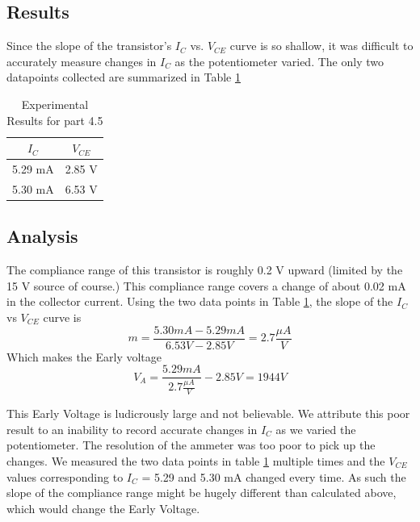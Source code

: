 \documentclass[12pt,letterpaper]{report}
\begin{document}
\subsection*{Results}
Since the slope of the transistor's $I_C$ vs. $V_{CE}$ curve is so shallow, it was difficult to accurately measure changes in $I_C$ as the potentiometer varied. The only two datapoints collected are summarized in Table \ref{table:4-6_results}

\begin{table}[ht]
\caption{Experimental Results for part 4.5} %
\centering 
    \begin{tabular}{| c | c |}
    \hline  
    $I_C$ & $V_{CE}$\\
    \hline
    5.29 mA & 2.85 V\\
    5.30 mA & 6.53 V\\
    \hline
    \end{tabular}
    \label{table:4-6_results}
\end{table}

\subsection*{Analysis}
The compliance range of this transistor is roughly 0.2 V upward (limited by the 15 V source of course.) This compliance range covers a change of about 0.02 mA in the collector current. Using the two data points in Table \ref{table:4-6_results}, the slope of the $I_C$ vs $V_{CE}$ curve is
$$
m = \frac{5.30 mA - 5.29 mA}{6.53V - 2.85V} = 2.7 \frac{\mu A}{V}
$$
Which makes the Early voltage
$$
V_A = \frac{5.29 mA}{2.7 \frac{\mu A}{V}} - 2.85 V = 1944 V
$$

This Early Voltage is ludicrously large and not believable. We attribute this poor result to an inability to record accurate changes in $I_C$ as we varied the potentiometer. The resolution of the ammeter was too poor to pick up the changes. We measured the two data points in table \ref{table:4-6_results} multiple times and the $V_{CE}$ values corresponding to $I_C$ = 5.29 and 5.30 mA changed every time. As such the slope of the compliance range might be hugely different than calculated above, which would change the Early Voltage.
\end{document}
